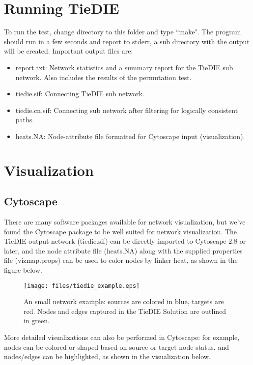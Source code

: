 \documentclass[11pt]{report}
\begin{document}
\clearpage

\section{Running TieDIE}

\noindent To run the test, change directory to this folder and type ``make". The program should run in a few seconds and report 
to stderr, a sub directory with the output will be created. Important output files are:

	\begin{itemize}
	\item report.txt: Network statistics and a summary report for the TieDIE sub network. Also includes the results of the 
	permutation test. 
	\item tiedie.sif: Connecting TieDIE sub network.
	\item tiedie.cn.sif: Connecting sub network after filtering for logically consistent paths. 
	\item heats.NA: Node-attribute file formatted for Cytoscape input (visualization). 
	\end{itemize}

\section{Visualization}

\subsection{Cytoscape}

\noindent There are many software packages available for network visualization, but we've found the Cytoscape package \cite{Cytoscape03} to be well suited for network visualization. The TieDIE output network (tiedie.sif) can be directly imported to Cytoscape 2.8 or later, and the node attribute file (heats.NA) along with the supplied properties file (vizmap.props) can be used to color nodes by linker heat, as shown in the figure below.

\begin{figure}[h]
    \texttt{[image: files/tiedie\_example.eps]}
	\caption{An small network example: sources are colored in blue, targets are red. Nodes and edges captured in the TieDIE Solution are outlined in green.}
    \label{fig:toy_network}
\end{figure}

\clearpage

More detailed visualizations can also be performed in Cytoscape: for example, nodes can be colored or shaped based on source or
target node status, and nodes/edges can be highlighted, as shown in the visualization below. 
\end{document}
